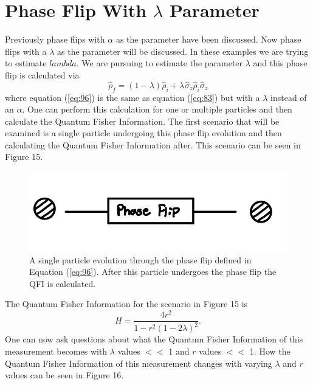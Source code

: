\documentclass[twocolumn]{article}
\begin{document}
\section*{Phase Flip With $\lambda$ Parameter}
Previously phase flips with $\alpha$ as the parameter have been discussed. Now phase flips with a $\lambda$ as the parameter will be discussed. In these examples we are trying to estimate $
lambda$. We are pursuing to estimate the parameter $\lambda$ and this phase flip is calculated via
\begin{equation}\label{eq:96}
\hat{\rho}_f=(1-\lambda)\hat{\rho}_i+\lambda\hspace{1pt}\hat{\sigma}_z\hat{\rho}_i\hat{\sigma}_z
\end{equation}
where equation (\ref{eq:96}) is the same as equation (\ref{eq:83}) but with a $\lambda$ instead of an $\alpha$. One can perform this calculation for one or multiple particles and then calculate the Quantum Fisher Information. The first scenario that will be examined is a single particle undergoing this phase flip evolution and then calculating the Quantum Fisher Information after. This scenario can be seen in Figure 15.
\newpage
\begin{figure}[h]
\begin{center}
\includegraphics[width=0.65\linewidth]{Single-Particle-Phase-Flip-Evolution-Schematic.jpg}
\caption{A single particle evolution through the phase flip defined in Equation (\ref{eq:96}). After this particle undergoes the phase flip the QFI is calculated.}
\end{center}
\end{figure}
The Quantum Fisher Information for the scenario in Figure 15 is
\begin{equation}\label{eq:97}
H=\frac{4r^2}{1-r^2(1-2\lambda)^2}.
\end{equation}
One can now ask questions about what the Quantum Fisher Information of this measurement becomes with $\lambda$ values $<<$ 1 and $r$ values $<<$ 1. How the Quantum Fisher Information of this measurement changes with varying $\lambda$ and $r$ values can be seen in Figure 16.
\end{document}
